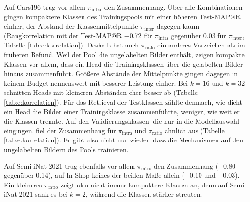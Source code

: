 Auf Cars196 trug vor allem $\pi_{\mathrm{intra}}$ den Zusammenhang. Über alle Kombinationen gingen kompaktere Klassen des Trainingspools mit einer höheren Test-\ac{MAP@R} einher, der Abstand der Klassenmittelpunkte $\pi_{\mathrm{inter}}$ dagegen kaum (Rangkorrelation mit der Test-\ac{MAP@R} \num{-0.72} für $\pi_{\mathrm{intra}}$ gegenüber \num{0.03} für $\pi_{\mathrm{inter}}$, Tabelle \ref{tab:e:korrelation}). Deshalb hat auch $\pi_{\mathrm{ratio}}$ ein anderes Vorzeichen als im früheren Befund. Weil der Pool die ungelabelten Bilder enthält, zeigen kompakte Klassen vor allem, dass ein Head die Trainingsklassen über die gelabelten Bilder hinaus zusammenführt. Größere Abstände der Mittelpunkte gingen dagegen in keinem Budget nennenswert mit besserer Leistung einher. Bei $k=16$ und $k=32$ schnitten Heads mit kleineren Abständen eher besser ab (Tabelle \ref{tab:e:korrelation}). Für das Retrieval der Testklassen zählte demnach, wie dicht ein Head die Bilder einer Trainingsklasse zusammenführte, weniger, wie weit er die Klassen trennte. Auf den Validierungsklassen, die nur in die Modellauswahl eingingen, fiel der Zusammenhang für $\pi_{\mathrm{intra}}$ und $\pi_{\mathrm{ratio}}$ ähnlich aus (Tabelle \ref{tab:e:korrelation}). Er gibt also nicht nur wieder, dass die Mechanismen auf den ungelabelten Bildern des Pools trainieren.

Auf Semi-iNat-2021 trug ebenfalls vor allem $\pi_{\mathrm{intra}}$ den Zusammenhang (\num{-0.80} gegenüber \num{0.14}), auf In-Shop keines der beiden Maße allein (\num{-0.10} und \num{-0.03}). Ein kleineres $\pi_{\mathrm{ratio}}$ zeigt also nicht immer kompaktere Klassen an, denn auf Semi-iNat-2021 sank es bei $k=2$, während die Klassen stärker streuten.

